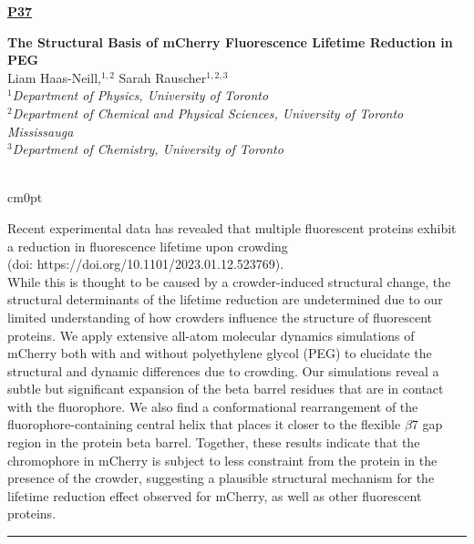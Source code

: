 \documentclass[titlepage,oneside,openany,10pt]{book}
\newenvironment{posterabswfig}[7] %
        {
	\FPeval{\cutw}{clip(16.7-#6)}
	\FPeval{\cutl}{round(#7/0.35+1,3)}
	\begin{flushright}
                \underline{\textbf{#4}}
        \end{flushright}
        \textbf{#1}\\%
        #2\\%
        \textit{#3}\\\\%
        \def\windowpagestuff{\centering
                \texttt{[image: \#5]}
	}
        \opencutright
        \begin{cutout}{0}{\cutw cm}{0pt}{\RoundingUpFunction{\cutl}}
        \noindent
	}
	{
	\end{cutout}
	\noindent\rule{15cm}{0.5pt}%
        }
\begin{document}
\begin{posterabswfig}
	{The Structural Basis of mCherry Fluorescence Lifetime Reduction in PEG}
	{Liam Haas-Neill,$^{1,2}$ Sarah Rauscher$^{1,2,3}$}
	{
	$^1$Department of Physics, University of Toronto\\
    $^2$Department of Chemical and Physical Sciences, University of Toronto Mississauga\\
    $^3$Department of Chemistry, University of Toronto
	}
	{P37}
	{abstract_figures/Haas-Neill_Liam_Poster.png}
	{9.0}
	{8.0}
	Recent experimental data has revealed that multiple fluorescent proteins exhibit a reduction in fluorescence lifetime upon crowding\\ (doi: https://doi.org/10.1101/2023.01.12.523769).\\ While this is thought to be caused by a crowder-induced structural change, the structural determinants of the lifetime reduction are undetermined due to our limited understanding of how crowders influence the structure of fluorescent proteins. We apply extensive all-atom molecular dynamics simulations of mCherry both with and without polyethylene glycol (PEG) to elucidate the structural and dynamic differences due to crowding. Our simulations reveal a subtle but significant expansion of the beta barrel residues that are in contact with the fluorophore. We also find a conformational rearrangement of the fluorophore-containing central helix that places it closer to the flexible $\beta$7 gap region in the protein beta barrel. Together, these results indicate that the chromophore in mCherry is subject to less constraint from the protein in the presence of the crowder, suggesting a plausible structural mechanism for the lifetime reduction effect observed for mCherry, as well as other fluorescent proteins.
	\label{Haas-neillL}
\end{posterabswfig}

\newpage
\end{document}
